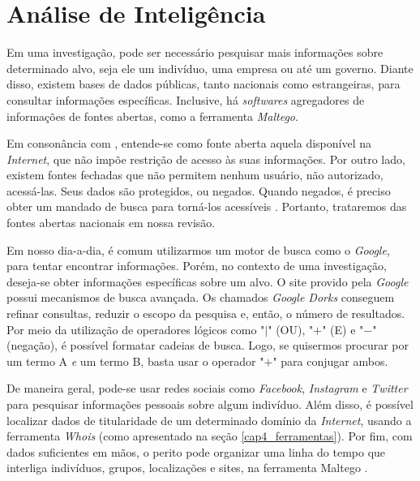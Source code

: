 \section{Análise de Inteligência}
    
    \vspace{10.5cm}
    
    \hspace{1cm}
    Em uma investigação, pode ser necessário pesquisar mais informações sobre determinado alvo, seja ele um indivíduo, uma empresa ou até um governo. Diante disso, existem bases de dados públicas, tanto nacionais como estrangeiras, para consultar informações específicas. Inclusive, há \textit{softwares} agregadores de informações de fontes abertas, como a ferramenta \textit{Maltego}.
    
    \vspace{4mm}
    
    \hspace{1cm}
    Em consonância com , entende-se como fonte aberta aquela disponível na \textit{Internet}, que não impõe restrição de acesso às suas informações. Por outro lado, existem fontes fechadas que não permitem nenhum usuário, não autorizado, acessá-las. Seus dados são protegidos, ou negados. Quando negados, é preciso obter um mandado de busca para torná-los acessíveis \cite{barreto2020}. Portanto, trataremos das fontes abertas nacionais em nossa revisão.
        
    \vspace{4mm}
    
    \hspace{1cm}
    Em nosso dia-a-dia, é comum utilizarmos um motor de busca como o \textit{Google}, para tentar encontrar  informações. Porém, no contexto de uma investigação, deseja-se obter informações específicas sobre um alvo. O site provido pela \textit{Google} possui mecanismos de busca avançada. Os chamados \textit{Google Dorks} conseguem refinar consultas, reduzir o escopo da pesquisa e, então, o número de resultados. Por meio da utilização de operadores lógicos como "$|$" (OU), "$+$" (E) e "$-$" (negação), é possível formatar cadeias de busca. Logo, se quisermos procurar por um termo A \textit{e} um termo B, basta usar o operador "$+$" para conjugar ambos.
        
    \vspace{4mm}
    
    \hspace{1cm}
    De maneira geral, pode-se usar redes sociais como \textit{Facebook}, \textit{Instagram} e \textit{Twitter} para pesquisar informações pessoais sobre algum indivíduo. Além disso, é possível localizar dados de titularidade de um determinado domínio da \textit{Internet}, usando a ferramenta \textit{Whois} (como apresentado na seção \ref{cap4_ferramentas}). Por fim, com dados suficientes em mãos, o perito pode organizar uma linha do tempo que interliga indivíduos, grupos, localizações e sites, na ferramenta Maltego \cite{bazzell2022}.
    
